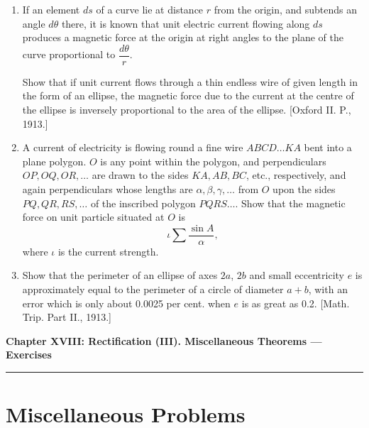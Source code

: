 \documentclass[11pt, a4paper]{article}
\newcommand{\source}[1]{\hfill\textnormal{[#1]}}
\begin{document}
\begin{enumerate}[leftmargin=2em]
\item If an element $ds$ of a curve lie at distance $r$ from the origin, and subtends an angle $d\theta$ there, it is known that unit electric current flowing along $ds$ produces a magnetic force at the origin at right angles to the plane of the curve proportional to $\dfrac{d\theta}{r}$.

Show that if unit current flows through a thin endless wire of given length in the form of an ellipse, the magnetic force due to the current at the centre of the ellipse is inversely proportional to the area of the ellipse. \source{Oxford II. P., 1913.}

\item A current of electricity is flowing round a fine wire $ABCD\dots KA$ bent into a plane polygon. $O$ is any point within the polygon, and perpendiculars $OP, OQ, OR,\dots$ are drawn to the sides $KA, AB, BC$, etc., respectively, and again perpendiculars whose lengths are $\alpha,\beta,\gamma,\dots$ from $O$ upon the sides $PQ, QR, RS,\dots$ of the inscribed polygon $PQRS\dots$. Show that the magnetic force on unit particle situated at $O$ is
\[
\iota\sum\frac{\sin A}{\alpha},
\]
where $\iota$ is the current strength.

\item Show that the perimeter of an ellipse of axes $2a$, $2b$ and small eccentricity $e$ is approximately equal to the perimeter of a circle of diameter $a+b$, with an error which is only about 0.0025 per cent. when $e$ is as great as 0.2. \source{Math. Trip. Part II., 1913.}

\end{enumerate}

\newpage

\begin{center}
    {\LARGE \bfseries \color{accent} Chapter XVIII: Rectification (III). Miscellaneous Theorems --- Exercises}\\
    \vspace{0.2cm}
    {\color{accent}\rule{0.55\linewidth}{0.8pt}}
\end{center}
\vspace{0.35cm}

\section*{Miscellaneous Problems}
\end{document}
